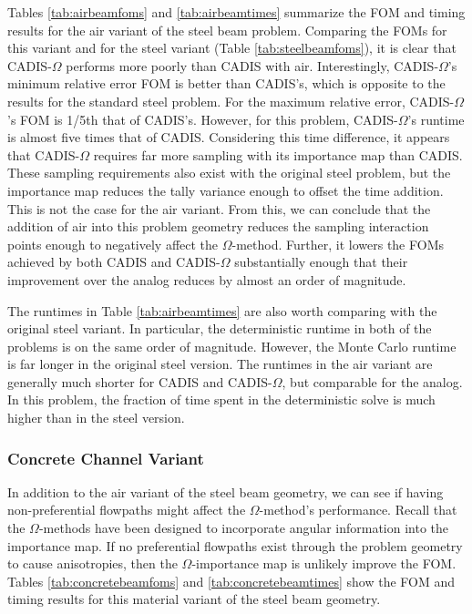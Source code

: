 Tables \ref{tab:airbeamfoms} and \ref{tab:airbeamtimes} summarize the FOM and timing
results for the air variant of the steel beam problem. Comparing the FOMs for
this variant and for the steel variant (Table \ref{tab:steelbeamfoms}), it is
clear that CADIS-$\Omega$ performs more poorly than CADIS with air.
Interestingly, CADIS-$\Omega$'s minimum relative error FOM is better than
CADIS's, which is opposite to the results for the standard steel problem. For the
maximum relative error, CADIS-$\Omega$'s FOM is 1/5th that of CADIS's. However,
for this problem, CADIS-$\Omega$'s runtime is almost five times that of CADIS.
Considering this time difference, it appears that CADIS-$\Omega$ requires far
more sampling with its importance map than CADIS. These sampling requirements
also exist with the original steel problem, but the importance map reduces the
tally variance enough to offset the time addition. This is not the case for the
air variant. From this, we can conclude that the addition of air into this
problem geometry reduces the sampling interaction points enough to negatively
affect the $\Omega$-method. Further, it lowers the FOMs achieved by both CADIS
and CADIS-$\Omega$ substantially enough that their improvement over the
analog reduces by almost an order of magnitude.

The runtimes in Table \ref{tab:airbeamtimes} are also worth comparing with the
original steel variant. In particular, the deterministic runtime in both of the
problems is on the same order of magnitude. However, the Monte Carlo runtime is
far longer in the original steel version. The runtimes in the air variant are
generally much shorter for CADIS and CADIS-$\Omega$, but comparable for the
analog. In this problem, the fraction of time spent in the
deterministic solve is much higher than in the steel version.

\subsubsection{Concrete Channel Variant}
\label{subsubsec:concretebeam}

In addition to the air variant of the steel beam geometry, we can see if having
non-preferential flowpaths might affect the $\Omega$-method's performance.
Recall that the $\Omega$-methods have been designed to incorporate angular
information into the importance map. If no preferential flowpaths exist through
the problem geometry to cause anisotropies, then the $\Omega$-importance map is unlikely improve the FOM. 
Tables \ref{tab:concretebeamfoms} and
\ref{tab:concretebeamtimes} show the FOM and timing results for this material
variant of the steel beam geometry.

